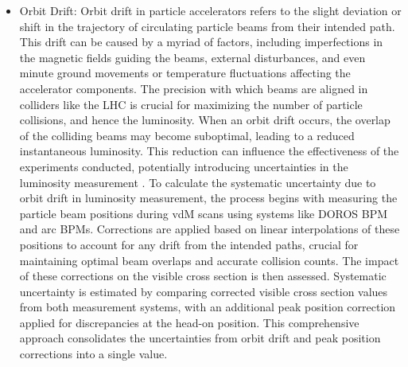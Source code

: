 \begin{itemize}

\item Orbit Drift: Orbit drift in particle accelerators refers to the slight deviation or shift in the trajectory of circulating particle beams from their intended path. This drift can be caused by a myriad of factors, including imperfections in the magnetic fields guiding the beams, external disturbances, and even minute ground movements or temperature fluctuations affecting the accelerator components. The precision with which beams are aligned in colliders like the LHC is crucial for maximizing the number of particle collisions, and hence the luminosity. When an orbit drift occurs, the overlap of the colliding beams may become suboptimal, leading to a reduced instantaneous luminosity. This reduction can influence the effectiveness of the experiments conducted, potentially introducing uncertainties in the luminosity measurement \cite{CERNOribLumi}. To calculate the systematic uncertainty due to orbit drift in luminosity measurement, the process begins with measuring the particle beam positions during vdM scans using systems like DOROS BPM and arc BPMs. Corrections are applied based on linear interpolations of these positions to account for any drift from the intended paths, crucial for maintaining optimal beam overlaps and accurate collision counts. The impact of these corrections on the visible cross section is then assessed. Systematic uncertainty is estimated by comparing corrected visible cross section values from both measurement systems, with an additional peak position correction applied for discrepancies at the head-on position. This comprehensive approach consolidates the uncertainties from orbit drift and peak position corrections into a single value.



\end{itemize}
